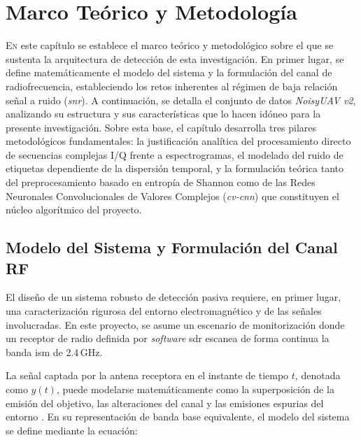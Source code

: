 \chapter{Marco Teórico y Metodología}
\label{cap:MarcoTeorico}


\lettrine[lraise=-0.1, lines=2, loversize=0.2]{E}{n} este capítulo se establece el marco teórico y metodológico sobre el que se sustenta la arquitectura de detección de esta investigación. En primer lugar, se define matemáticamente el modelo del sistema y la formulación del canal de radiofrecuencia, estableciendo los retos inherentes al régimen de baja relación señal a ruido (\textit{\gls{snr}}). A continuación, se detalla el conjunto de datos \textit{NoisyUAV v2}, analizando su estructura y sus características que lo hacen idóneo para la presente investigación. Sobre esta base, el capítulo desarrolla tres pilares metodológicos fundamentales: la justificación analítica del procesamiento directo de secuencias complejas I/Q frente a espectrogramas, el modelado del ruido de etiquetas dependiente de la dispersión temporal, y la formulación teórica tanto del preprocesamiento basado en entropía de Shannon como de las Redes Neuronales Convolucionales de Valores Complejos (\textit{\gls{cv-cnn}}) que constituyen el núcleo algorítmico del proyecto.

\section{Modelo del Sistema y Formulación del Canal RF}
\label{sec:modelo_sistema}
El diseño de un sistema robusto de detección pasiva requiere, en primer lugar, una caracterización rigurosa del entorno electromagnético y de las señales involucradas. En este proyecto, se asume un escenario de monitorización donde un receptor de radio definida por \textit{software} \gls{sdr} escanea de forma continua la banda {\gls{ism}} de 2.4\,GHz.

La señal captada por la antena receptora en el instante de tiempo $t$, denotada como $y(t)$, puede modelarse matemáticamente como la superposición de la emisión del objetivo, las alteraciones del canal y las emisiones espurias del entorno \cite{rout_novel_2025, ezuma_detection_2020}. En su representación de banda base equivalente, el modelo del sistema se define mediante la ecuación:

